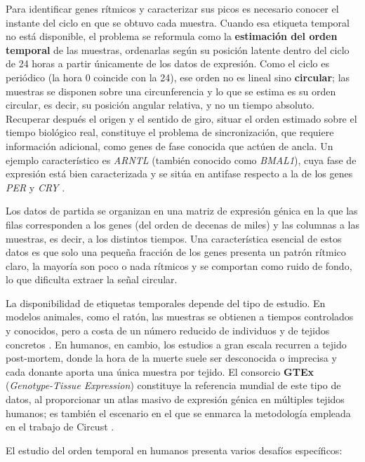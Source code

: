 \documentclass[12pt, a4paper]{report}
\begin{document}
Para identificar genes rítmicos y caracterizar sus picos es necesario conocer el instante del ciclo en que se obtuvo cada muestra. Cuando esa etiqueta temporal no está disponible, el problema se reformula como la \textbf{estimación del orden temporal} de las muestras, ordenarlas según su posición latente dentro del ciclo de 24 horas a partir únicamente de los datos de expresión. Como el ciclo es periódico (la hora 0 coincide con la 24), ese orden no es lineal sino \textbf{circular}; las muestras se disponen sobre una circunferencia y lo que se estima es su orden circular, es decir, su posición angular relativa, y no un tiempo absoluto. Recuperar después el origen y el sentido de giro, situar el orden estimado sobre el tiempo biológico real, constituye el problema de sincronización, que requiere información adicional, como genes de fase conocida que actúen de ancla. Un ejemplo característico es \textit{ARNTL} (también conocido como \textit{BMAL1}), cuya fase de expresión está bien caracterizada y se sitúa en antifase respecto a la de los genes \textit{PER} y \textit{CRY} \cite{ueda2005}.

Los datos de partida se organizan en una matriz de expresión génica en la que las filas corresponden a los genes (del orden de decenas de miles) y las columnas a las muestras, es decir, a los distintos tiempos. Una característica esencial de estos datos es que solo una pequeña fracción de los genes presenta un patrón rítmico claro, la mayoría son poco o nada rítmicos y se comportan como ruido de fondo, lo que dificulta extraer la señal circular.

La disponibilidad de etiquetas temporales depende del tipo de estudio. En modelos animales, como el ratón, las muestras se obtienen a tiempos controlados y conocidos, pero a costa de un número reducido de individuos y de tejidos concretos \cite{panda2002}. En humanos, en cambio, los estudios a gran escala recurren a tejido post-mortem, donde la hora de la muerte suele ser desconocida o imprecisa y cada donante aporta una única muestra por tejido. El consorcio \textbf{GTEx} (\textit{Genotype-Tissue Expression}) \cite{gtex2020} constituye la referencia mundial de este tipo de datos, al proporcionar un atlas masivo de expresión génica en múltiples tejidos humanos; es también el escenario en el que se enmarca la metodología empleada en el trabajo de Circust \cite{larriba2023}.

El estudio del orden temporal en humanos presenta varios desafíos específicos:
\end{document}
